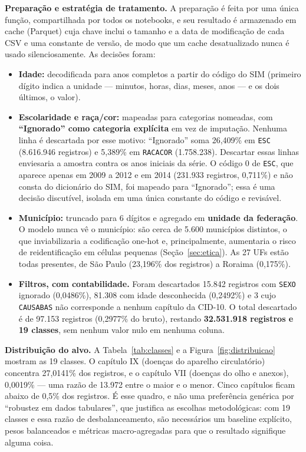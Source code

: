 \documentclass[12pt]{article}
\begin{document}
\textbf{Preparação e estratégia de tratamento.} A preparação é feita por uma
única função, compartilhada por todos os notebooks, e seu resultado é
armazenado em cache (Parquet) cuja chave inclui o tamanho e a data de
modificação de cada CSV e uma constante de versão, de modo que um cache
desatualizado nunca é usado silenciosamente. As decisões foram:

\begin{itemize}
  \item \textbf{Idade:} decodificada para anos completos a partir do código do
    SIM (primeiro dígito indica a unidade --- minutos, horas, dias, meses,
    anos --- e os dois últimos, o valor).
  \item \textbf{Escolaridade e raça/cor:} mapeadas para categorias nomeadas,
    com \textbf{``Ignorado'' como categoria explícita} em vez de imputação.
    Nenhuma linha é descartada por esse motivo: ``Ignorado'' soma 26,409\%
    em \texttt{ESC} (8.616.946 registros) e 5,389\% em \texttt{RACACOR}
    (1.758.238). Descartar essas linhas enviesaria a amostra contra os anos
    iniciais da série. O código 0 de \texttt{ESC}, que aparece apenas em 2009
    a 2012 e em 2014 (231.933 registros, 0,711\%) e não consta do dicionário
    do SIM, foi mapeado para ``Ignorado''; essa é uma decisão discutível,
    isolada em uma única constante do código e revisável.
  \item \textbf{Município:} truncado para 6 dígitos e agregado em
    \textbf{unidade da federação}. O modelo nunca vê o município: são cerca de
    5.600 municípios distintos, o que inviabilizaria a codificação one-hot e,
    principalmente, aumentaria o risco de reidentificação em células pequenas
    (Seção~\ref{sec:etica}). As 27 UFs estão todas presentes, de São Paulo
    (23,196\% dos registros) a Roraima (0,175\%).
  \item \textbf{Filtros, com contabilidade.} Foram descartados 15.842
    registros com \texttt{SEXO} ignorado (0,0486\%), 81.308 com idade
    desconhecida (0,2492\%) e 3 cujo \texttt{CAUSABAS} não corresponde a
    nenhum capítulo da CID-10. O total descartado é de 97.153 registros
    (0,2977\% do bruto), restando \textbf{32.531.918 registros e 19 classes},
    sem nenhum valor nulo em nenhuma coluna.
\end{itemize}

\textbf{Distribuição do alvo.} A Tabela~\ref{tab:classes} e a
Figura~\ref{fig:distribuicao} mostram as 19 classes. O capítulo IX (doenças do
aparelho circulatório) concentra 27,0141\% dos registros, e o capítulo VII
(doenças do olho e anexos), 0,0019\% --- uma razão de 13.972 entre o maior e o
menor. Cinco capítulos ficam abaixo de 0,5\% dos registros. É esse quadro, e
não uma preferência genérica por ``robustez em dados tabulares'', que justifica
as escolhas metodológicas: com 19 classes e essa razão de desbalanceamento,
são necessários um baseline explícito, pesos balanceados e métricas
macro-agregadas para que o resultado signifique alguma coisa.
\end{document}
